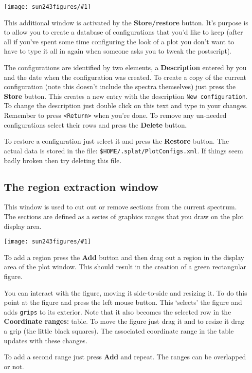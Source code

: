 \documentclass[twoside,11pt]{article}
\newcommand{\htmladdimg}[1]{}
\newcommand{\latexhtml}[2]{#1}
\renewcommand{\_}{\texttt{\symbol{95}}}
\newcommand{\mainfigure}[1]
{\begin{center}
 \latexhtml{\texttt{[image: sun243\_figures/\#1]}}{\htmladdimg{#1.gif}}
 \end{center}
}
\newcommand{\labelitem}[1]{\textbf{#1}}
\newcommand{\hitext}[1]{\texttt{#1}}
\begin{document}
\mainfigure{restorewindow}

This additional window is activated by the \labelitem{Store/restore}
button. It's purpose is to allow you to create a database of configurations
that you'd like to keep (after all if you've spent some time configuring the
look of a plot you don't want to have to type it all in again when someone
asks you to tweak the postscript).

The configurations are identified by two elements, a
\labelitem{Description} entered by you and the date when the
configuration was created. To create a copy of the current configuration
(note this doesn't include the spectra themselves) just press the
\labelitem{Store} button. This creates a new entry with the description
\hitext{New configuration}. To change the description just double
click on this text and type in your changes. Remember to press
\hitext{<Return>} when you're done. To remove any un-needed
configurations select their rows and press the \labelitem{Delete}
button.

To restore a configuration just select it and press the
\labelitem{Restore} button. The actual data is stored in the file:
\hitext{\$HOME/.splat/PlotConfigs.xml}. If things seem badly broken
then try deleting this file.

\newpage
\subsection{The region extraction window}

This window is used to cut out or remove sections from the current
spectrum. The sections are defined as a series of graphics ranges that
you draw on the plot display area.

\mainfigure{cutterwindow}

To add a region press the \labelitem{Add} button and then drag out a
region in the display area of the plot window. This should result in
the creation of a green rectangular figure.

You can interact with the figure, moving it side-to-side and resizing
it. To do this point at the figure and press the left mouse
button. This `selects' the figure and adds \hitext{grips} to its
exterior. Note that it also becomes the selected row in the
\labelitem{Coordinate ranges:} table. To move the figure just drag it
and to resize it drag a grip (the little black squares). The
associated coordinate range in the table updates with these changes.

To add a second range just press \labelitem{Add} and repeat. The
ranges can be overlapped or not.
\end{document}
